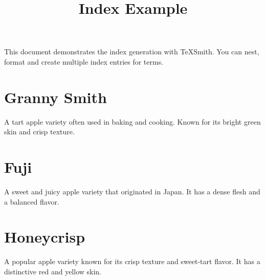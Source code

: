 \documentclass[a6paper,twoside]{article}
\title{Index Example}
\author{}\date{}
\begin{document}
\maketitle

\thispagestyle{plain}
This document demonstrates the index generation with TeXSmith. You can nest, format and create multiple index entries for terms.

\section{Granny Smith}\label{granny-smith}

A tart apple variety often used in baking and cooking. Known for its bright green skin and crisp texture.
 

\clearpage

\section{Fuji}\label{fuji}

A sweet and juicy apple variety that originated in Japan. It has a dense flesh and a balanced flavor.

  

\clearpage

\section{Honeycrisp}\label{honeycrisp}

A popular apple variety known for its crisp texture and sweet-tart flavor. It has a distinctive red and yellow skin.

 

\printindex
\end{document}
